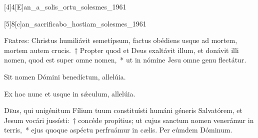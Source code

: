 \documentclass[vesperale_romanum.tex]{subfiles}
\begin{document}
\label{111_3a2}
{}

[4]{4}[E]{an_a_solis_ortu_solesmes_1961}




[5]{8}[c]{an_sacrificabo_hostiam_solesmes_1961}




\lettrine{F}{r}atres: Christus humiliávit semetípsum, factus obédiens usque ad mortem, mortem autem crucis.~† Propter quod et Deus exaltávit illum, et donávit illi nomen, quod est super omne nomen,~* ut in nómine Jesu omne genu flectátur.

\hymnus


\vv Sit nomen Dómini benedíctum, allelúia.

\rr Ex hoc nunc et usque in sǽculum, allelúia.


\oratio

\lettrine{D}{e}us, qui unigénitum Fílium tuum constituísti humáni géneris Salvatórem, et Jesum vocári jussísti:~† concéde propítius; ut cujus san\-ctum nomen venerámur in terris,~* ejus quoque aspéctu perfruámur in cælis. Per eúmdem Dóminum.



\omniapraeter



\simplex

%
%
\end{document}
